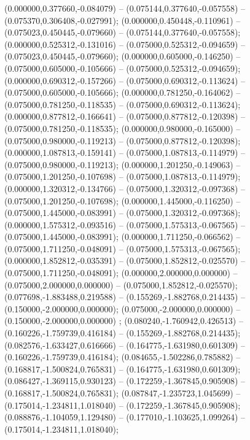  (0.000000,0.377660,-0.084079) -- (0.075144,0.377640,-0.057558) -- (0.075370,0.306408,-0.027991);
 (0.000000,0.450448,-0.110961) -- (0.075023,0.450445,-0.079660) -- (0.075144,0.377640,-0.057558);
 (0.000000,0.525312,-0.131016) -- (0.075000,0.525312,-0.094659) -- (0.075023,0.450445,-0.079660);
 (0.000000,0.605000,-0.146250) -- (0.075000,0.605000,-0.105666) -- (0.075000,0.525312,-0.094659);
 (0.000000,0.690312,-0.157266) -- (0.075000,0.690312,-0.113624) -- (0.075000,0.605000,-0.105666);
 (0.000000,0.781250,-0.164062) -- (0.075000,0.781250,-0.118535) -- (0.075000,0.690312,-0.113624);
 (0.000000,0.877812,-0.166641) -- (0.075000,0.877812,-0.120398) -- (0.075000,0.781250,-0.118535);
 (0.000000,0.980000,-0.165000) -- (0.075000,0.980000,-0.119213) -- (0.075000,0.877812,-0.120398);
 (0.000000,1.087813,-0.159141) -- (0.075000,1.087813,-0.114979) -- (0.075000,0.980000,-0.119213);
 (0.000000,1.201250,-0.149063) -- (0.075000,1.201250,-0.107698) -- (0.075000,1.087813,-0.114979);
 (0.000000,1.320312,-0.134766) -- (0.075000,1.320312,-0.097368) -- (0.075000,1.201250,-0.107698);
 (0.000000,1.445000,-0.116250) -- (0.075000,1.445000,-0.083991) -- (0.075000,1.320312,-0.097368);
 (0.000000,1.575312,-0.093516) -- (0.075000,1.575313,-0.067565) -- (0.075000,1.445000,-0.083991);
 (0.000000,1.711250,-0.066562) -- (0.075000,1.711250,-0.048091) -- (0.075000,1.575313,-0.067565);
 (0.000000,1.852812,-0.035391) -- (0.075000,1.852812,-0.025570) -- (0.075000,1.711250,-0.048091);
 (0.000000,2.000000,0.000000) -- (0.075000,2.000000,0.000000) -- (0.075000,1.852812,-0.025570);
 (0.077698,-1.883488,0.219588) -- (0.155269,-1.882768,0.214435) -- (0.150000,-2.000000,0.000000);
 (0.075000,-2.000000,0.000000) -- (0.150000,-2.000000,0.000000) ;
 (0.080240,-1.760942,0.426513) -- (0.160226,-1.759739,0.416184) -- (0.155269,-1.882768,0.214435);
 (0.082576,-1.633427,0.616666) -- (0.164775,-1.631980,0.601309) -- (0.160226,-1.759739,0.416184);
 (0.084655,-1.502286,0.785882) -- (0.168817,-1.500824,0.765831) -- (0.164775,-1.631980,0.601309);
 (0.086427,-1.369115,0.930123) -- (0.172259,-1.367845,0.905908) -- (0.168817,-1.500824,0.765831);
 (0.087847,-1.235723,1.045699) -- (0.175014,-1.234811,1.018040) -- (0.172259,-1.367845,0.905908);
 (0.088876,-1.104059,1.129480) -- (0.177010,-1.103625,1.099264) -- (0.175014,-1.234811,1.018040);
